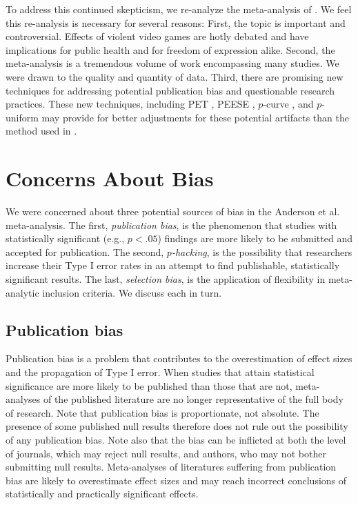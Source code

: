 \documentclass[man, mask]{apa6}
\begin{document}
To address this continued skepticism, we re-analyze the meta-analysis of \citet{Anderson:etal:2010}. We feel this re-analysis is necessary for several reasons:  First, the topic is important and controversial. Effects of violent video games are hotly debated and have implications for public health and for freedom of expression alike. Second, the \citet{Anderson:etal:2010} meta-analysis is a tremendous volume of work encompassing many studies. We were drawn to the quality and quantity of data. Third, there are promising new techniques for addressing potential publication bias and questionable research practices.  These new techniques, including PET \citep[Precision-Effect Test,][]{Stanley:Doucouliagos:2014}, PEESE \citep[Precision-Effect Estimate with Standard Error,][]{Stanley:Doucouliagos:2014}, $p$-curve \citep{Simonsohn:etal:2014,Simonsohn:etal:2014b}, and $p$-uniform \citet{vanAssen:etal:2015} may provide for better adjustments for these potential artifacts than the method used in \citet{Anderson:etal:2010}. 

\section{Concerns About Bias}
We were concerned about three potential sources of bias in the Anderson et al. meta-analysis. The first, {\em publication bias}, is the phenomenon that studies with statistically significant (e.g., $p<.05$) findings are more likely to be submitted and accepted for publication. The second, {\em $p$-hacking}, is the possibility that researchers increase their Type I error rates in an attempt to find publishable, statistically significant results. The last, {\em selection bias}, is the application of flexibility in meta-analytic inclusion criteria. We discuss each in turn.

\subsection{Publication bias}
Publication bias is a problem that contributes to the overestimation of effect sizes and the propagation of Type I error. When studies that attain statistical significance are more likely to be published than those that are not, meta-analyses of the published literature are no longer representative of the full body of research. Note that publication bias is proportionate, not absolute. The presence of some published null results therefore does not rule out the possibility of any publication bias. Note also that the bias can be inflicted at both the level of journals, which may reject null results, and authors, who may not bother submitting null results.
Meta-analyses of literatures suffering from publication bias are likely to overestimate effect sizes and may reach incorrect conclusions of statistically and practically significant effects.
\end{document}
